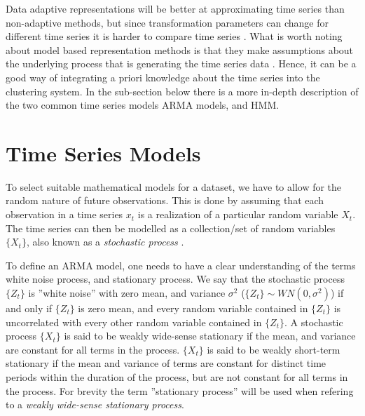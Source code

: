 Data adaptive representations will be better at approximating time series than non-adaptive methods, but since transformation parameters can change for different time series it is harder to compare time series \cite{tsc_rev}. What is worth noting about model based representation methods is that they make assumptions about the underlying process that is generating the time series data \cite{ts_data_mining}. Hence, it can be a good way of integrating a priori knowledge about the time series into the clustering system. %
In the sub-section below there is a more in-depth description of the two common time series models ARMA models, and HMM. %

\section{Time Series Models} \label{sec:ts_models}
To select suitable mathematical models for a dataset, we have to allow for the random nature of future observations. This is done by assuming that each observation in a time series $x_t$ is a realization of a particular random variable $X_t$. The time series can then be modelled as a collection/set of random variables $\{X_t\}$, also known as a \textit{stochastic process} \cite{brockwell_davis_advanced}. \bigskip

To define an ARMA model, one needs to have a clear understanding of the terms white noise process, and stationary process. We say that the stochastic process $\{Z_t\}$ is ''white noise'' with zero mean, and variance $\sigma^2$ ($\{Z_t\} \sim WN(0, \sigma^2)$) if and only if $\{Z_t\}$ is zero mean, and every random variable contained in $\{Z_t\}$ is uncorrelated with every other random variable contained in $\{Z_t\}$. %
A stochastic process $\{X_t\}$ is said to be weakly wide-sense stationary if the mean, and variance are constant for all terms in the process. $\{X_t\}$ is said to be weakly short-term stationary if the mean and variance of terms are constant for distinct time periods within the duration of the process, but are not constant for all terms in the process. For brevity the term ''stationary process'' will be used when refering to a \textit{weakly wide-sense stationary process}. 

